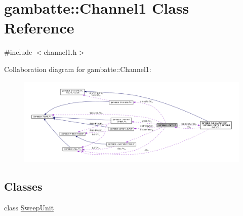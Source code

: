 \hypertarget{classgambatte_1_1Channel1}{}\section{gambatte\+:\+:Channel1 Class Reference}
\label{classgambatte_1_1Channel1}


{\ttfamily \#include $<$channel1.\+h$>$}



Collaboration diagram for gambatte\+:\+:Channel1\+:
\nopagebreak
\begin{figure}[H]
\begin{center}
\leavevmode
\includegraphics[width=350pt]{classgambatte_1_1Channel1__coll__graph}
\end{center}
\end{figure}
\subsection*{Classes}
\begin{DoxyCompactItemize}
\item 
class \hyperlink{classgambatte_1_1Channel1_1_1SweepUnit}{Sweep\+Unit}
\end{DoxyCompactItemize}
